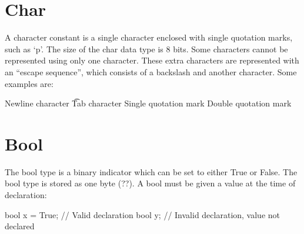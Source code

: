 \begin{homeworkProblem}
	\section{Char}
	
	A character constant is a single character enclosed with single quotation marks, such as ‘p’. The size of the char data type is 8 bits. Some characters cannot be represented using only one character. These extra characters are represented with an “escape sequence”, which consists of a backslash and another character. Some examples are:
	
	\n  Newline character
	\t   Tab character
	\’   Single quotation mark
	\:   Double quotation mark
	
	\section{Bool}
	
	The bool type is a binary indicator which can be set to either True or False. The bool type is stored as one byte (??). A bool must be given a value at the time of declaration:
	
	bool x = True;  // Valid declaration
	bool y;  // Invalid declaration, value not declared
	
	
	
	


\end{homeworkProblem}